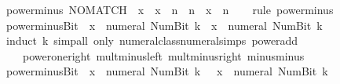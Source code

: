 \begin{isabellebody}
\isanewline
{}\isamarkupfalse%
\ power{\isacharunderscore}{\kern0pt}minus{\isacharprime}{\kern0pt}{\isacharcolon}{\kern0pt}\ {\isachardoublequoteopen}NO{\isacharunderscore}{\kern0pt}MATCH\ {}\ x\ {\isasymLongrightarrow}\ {\isacharparenleft}{\kern0pt}{\isacharminus}{\kern0pt}x{\isacharparenright}{\kern0pt}\ {\isacharcircum}{\kern0pt}\ n\ {\isacharequal}{\kern0pt}\ {\isacharparenleft}{\kern0pt}{\isacharminus}{\kern0pt}{}{\isacharparenright}{\kern0pt}{\isacharcircum}{\kern0pt}n\ {\isacharasterisk}{\kern0pt}\ x\ {\isacharcircum}{\kern0pt}\ n{\isachardoublequoteclose}\isanewline
%
\isadelimproof
\ \ %
\endisadelimproof
%
\isatagproof
{}\isamarkupfalse%
\ {\isacharparenleft}{\kern0pt}rule\ power{\isacharunderscore}{\kern0pt}minus{\isacharparenright}{\kern0pt}%
\endisatagproof
{\isafoldproof}%
%
\isadelimproof
\isanewline
%
\endisadelimproof
\isanewline
{}\isamarkupfalse%
\ power{\isacharunderscore}{\kern0pt}minus{\isacharunderscore}{\kern0pt}Bit{}{\isacharcolon}{\kern0pt}\ {\isachardoublequoteopen}{\isacharparenleft}{\kern0pt}{\isacharminus}{\kern0pt}\ x{\isacharparenright}{\kern0pt}\ {\isacharcircum}{\kern0pt}\ numeral\ {\isacharparenleft}{\kern0pt}Num{\isachardot}{\kern0pt}Bit{}\ k{\isacharparenright}{\kern0pt}\ {\isacharequal}{\kern0pt}\ x\ {\isacharcircum}{\kern0pt}\ numeral\ {\isacharparenleft}{\kern0pt}Num{\isachardot}{\kern0pt}Bit{}\ k{\isacharparenright}{\kern0pt}{\isachardoublequoteclose}\isanewline
%
\isadelimproof
\ \ %
\endisadelimproof
%
\isatagproof
{}\isamarkupfalse%
\ {\isacharparenleft}{\kern0pt}induct\ k{\isacharcomma}{\kern0pt}\ simp{\isacharunderscore}{\kern0pt}all\ only{\isacharcolon}{\kern0pt}\ numeral{\isacharunderscore}{\kern0pt}class{\isachardot}{\kern0pt}numeral{\isachardot}{\kern0pt}simps\ power{\isacharunderscore}{\kern0pt}add\isanewline
\ \ \ \ power{\isacharunderscore}{\kern0pt}one{\isacharunderscore}{\kern0pt}right\ mult{\isacharunderscore}{\kern0pt}minus{\isacharunderscore}{\kern0pt}left\ mult{\isacharunderscore}{\kern0pt}minus{\isacharunderscore}{\kern0pt}right\ minus{\isacharunderscore}{\kern0pt}minus{\isacharparenright}{\kern0pt}%
\endisatagproof
{\isafoldproof}%
%
\isadelimproof
\isanewline
%
\endisadelimproof
\isanewline
{}\isamarkupfalse%
\ power{\isacharunderscore}{\kern0pt}minus{\isacharunderscore}{\kern0pt}Bit{}{\isacharcolon}{\kern0pt}\ {\isachardoublequoteopen}{\isacharparenleft}{\kern0pt}{\isacharminus}{\kern0pt}\ x{\isacharparenright}{\kern0pt}\ {\isacharcircum}{\kern0pt}\ numeral\ {\isacharparenleft}{\kern0pt}Num{\isachardot}{\kern0pt}Bit{}\ k{\isacharparenright}{\kern0pt}\ {\isacharequal}{\kern0pt}\ {\isacharminus}{\kern0pt}\ {\isacharparenleft}{\kern0pt}x\ {\isacharcircum}{\kern0pt}\ numeral\ {\isacharparenleft}{\kern0pt}Num{\isachardot}{\kern0pt}Bit{}\ k{\isacharparenright}{\kern0pt}{\isacharparenright}{\kern0pt}{\isachardoublequoteclose}\isanewline

\end{isabellebody}
